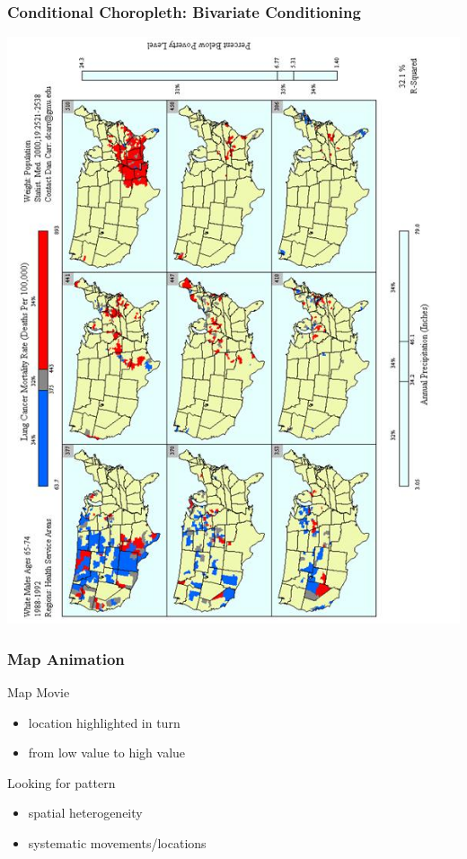 \documentclass[nototal,handout]{beamer}
\begin{document}
\begin{frame}
	\frametitle{Conditional Choropleth: Bivariate Conditioning}
 \begin{center}
 \includegraphics[angle=270,width=.85\linewidth]{conditionalchoropleth1.png}
  \end{center}
 \end{frame} 

\begin{frame}
	\frametitle{Map Animation}
 
\begin{block}{Map Movie}
 \begin{itemize}
 \item  location highlighted in turn
 \item  from low value to high value
 \end{itemize}
 \end{block} 
\begin{block}{Looking for pattern}
 \begin{itemize}
 \item  spatial  heterogeneity
 \item  systematic movements/locations
 \end{itemize}
 \end{block} \end{frame} 
\end{document}

